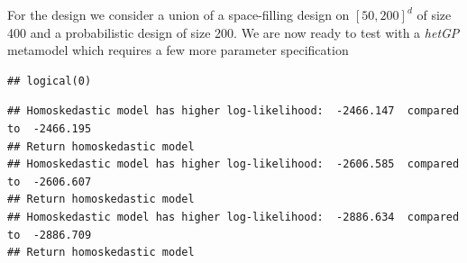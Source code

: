 \documentclass[]{article}
\newenvironment{Shaded}{\begin{snugshade}}{\end{snugshade}}
\newcommand{\KeywordTok}[1]{\textcolor[rgb]{0.13,0.29,0.53}{\textbf{#1}}}
\newcommand{\DataTypeTok}[1]{\textcolor[rgb]{0.13,0.29,0.53}{#1}}
\newcommand{\DecValTok}[1]{\textcolor[rgb]{0.00,0.00,0.81}{#1}}
\newcommand{\StringTok}[1]{\textcolor[rgb]{0.31,0.60,0.02}{#1}}
\newcommand{\CommentTok}[1]{\textcolor[rgb]{0.56,0.35,0.01}{\textit{#1}}}
\newcommand{\OperatorTok}[1]{\textcolor[rgb]{0.81,0.36,0.00}{\textbf{#1}}}
\newcommand{\NormalTok}[1]{#1}
\begin{document}
For the design we consider a union of a space-filling design on
\([50,200]^d\) of size 400 and a probabilistic design of size 200. We
are now ready to test with a \emph{hetGP} metamodel which requires a few
more parameter specification

\begin{Shaded}
\end{Shaded}

\begin{verbatim}
## logical(0)
\end{verbatim}

\begin{Shaded}
\end{Shaded}

\begin{verbatim}
## Homoskedastic model has higher log-likelihood:  -2466.147  compared to  -2466.195
## Return homoskedastic model
## Homoskedastic model has higher log-likelihood:  -2606.585  compared to  -2606.607
## Return homoskedastic model
## Homoskedastic model has higher log-likelihood:  -2886.634  compared to  -2886.709
## Return homoskedastic model
\end{verbatim}
\end{document}
